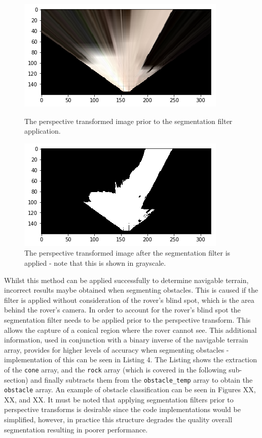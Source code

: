 \documentclass[a4paper]{article}
\begin{document}
\begin{figure}[h]
\centering
	\begin{minipage}[t]{0.45\linewidth}
	\centering
	\includegraphics[scale=0.5]{image6}
	\caption{The perspective transformed image prior to the segmentation filter application.}
	\end{minipage}
	\hspace{0.5cm}
	\begin{minipage}[t]{0.45\linewidth}
	\centering
	\includegraphics[scale=0.5]{image7}
	\caption{The perspective transformed image after the segmentation filter is applied - note that this is shown in grayscale.}
	\end{minipage}
\end{figure}

Whilst this method can be applied successfully to determine navigable terrain, incorrect results maybe obtained when segmenting obstacles. This is caused if the filter is applied without consideration of the rover's blind spot, which is the area behind the rover's camera. In order to account for the rover's blind spot the segmentation filter needs to be applied prior to the perspective transform. This allows the capture of a conical region where the rover cannot see. This additional information, used in conjunction with a binary inverse of the navigable terrain array, provides for higher levels of accuracy when segmenting obstacles - implementation of this can be seen in Listing 4. The Listing shows the extraction of the \verb|cone| array, and the \verb|rock| array (which is covered in the following sub-section) and finally subtracts them from the \verb|obstacle_temp| array to obtain the \verb|obstacle| array. An example of obstacle classification can be seen in Figures XX, XX, and XX. It must be noted that applying segmentation filters prior to perspective transforms is desirable since the code implementations would be simplified, however, in practice this structure degrades the quality overall segmentation resulting in poorer performance.\\
\end{document}
